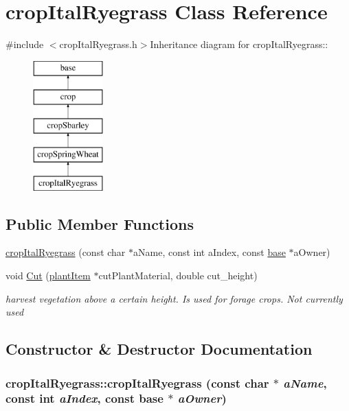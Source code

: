 \hypertarget{classcrop_ital_ryegrass}{
\section{cropItalRyegrass Class Reference}
\label{classcrop_ital_ryegrass}
}


{\ttfamily \#include $<$cropItalRyegrass.h$>$}Inheritance diagram for cropItalRyegrass::\begin{figure}[H]
\begin{center}
\leavevmode
\includegraphics[height=5cm]{classcrop_ital_ryegrass}
\end{center}
\end{figure}
\subsection*{Public Member Functions}
\begin{DoxyCompactItemize}
\item 
\hyperlink{classcrop_ital_ryegrass_a82d3fa751bf43b25f783c9bf9dc55071}{cropItalRyegrass} (const char $\ast$aName, const int aIndex, const \hyperlink{classbase}{base} $\ast$aOwner)
\item 
void \hyperlink{classcrop_ital_ryegrass_a0cf33f1022b9cbc023df110f68cac622}{Cut} (\hyperlink{classplant_item}{plantItem} $\ast$cutPlantMaterial, double cut\_\-height)
\begin{DoxyCompactList}\small\item\em harvest vegetation above a certain height. Is used for forage crops. Not currently used \item\end{DoxyCompactList}\end{DoxyCompactItemize}


\subsection{Constructor \& Destructor Documentation}
\hypertarget{classcrop_ital_ryegrass_a82d3fa751bf43b25f783c9bf9dc55071}{
\subsubsection[{cropItalRyegrass}]{\setlength{\rightskip}{0pt plus 5cm}cropItalRyegrass::cropItalRyegrass (const char $\ast$ {\em aName}, \/  const int {\em aIndex}, \/  const {\bf base} $\ast$ {\em aOwner})}}
\label{classcrop_ital_ryegrass_a82d3fa751bf43b25f783c9bf9dc55071}


